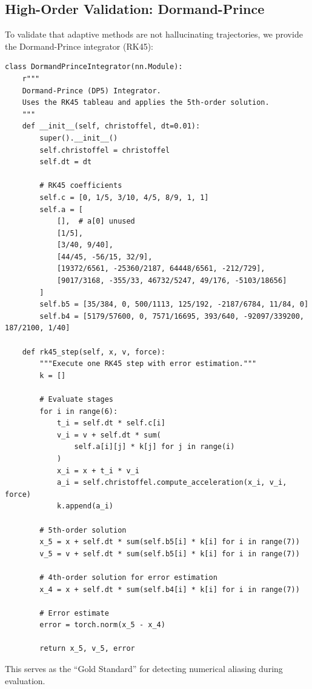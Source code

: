 \documentclass[12pt,letterpaper,twoside]{article}
\begin{document}
\subsection{High-Order Validation: Dormand-Prince}

To validate that adaptive methods are not hallucinating trajectories, we provide the Dormand-Prince integrator (RK45):

\begin{verbatim}
class DormandPrinceIntegrator(nn.Module):
    r"""
    Dormand-Prince (DP5) Integrator.
    Uses the RK45 tableau and applies the 5th-order solution.
    """
    def __init__(self, christoffel, dt=0.01):
        super().__init__()
        self.christoffel = christoffel
        self.dt = dt
        
        # RK45 coefficients
        self.c = [0, 1/5, 3/10, 4/5, 8/9, 1, 1]
        self.a = [
            [],  # a[0] unused
            [1/5],
            [3/40, 9/40],
            [44/45, -56/15, 32/9],
            [19372/6561, -25360/2187, 64448/6561, -212/729],
            [9017/3168, -355/33, 46732/5247, 49/176, -5103/18656]
        ]
        self.b5 = [35/384, 0, 500/1113, 125/192, -2187/6784, 11/84, 0]
        self.b4 = [5179/57600, 0, 7571/16695, 393/640, -92097/339200, 187/2100, 1/40]
    
    def rk45_step(self, x, v, force):
        """Execute one RK45 step with error estimation."""
        k = []
        
        # Evaluate stages
        for i in range(6):
            t_i = self.dt * self.c[i]
            v_i = v + self.dt * sum(
                self.a[i][j] * k[j] for j in range(i)
            )
            x_i = x + t_i * v_i
            a_i = self.christoffel.compute_acceleration(x_i, v_i, force)
            k.append(a_i)
        
        # 5th-order solution
        x_5 = x + self.dt * sum(self.b5[i] * k[i] for i in range(7))
        v_5 = v + self.dt * sum(self.b5[i] * k[i] for i in range(7))
        
        # 4th-order solution for error estimation
        x_4 = x + self.dt * sum(self.b4[i] * k[i] for i in range(7))
        
        # Error estimate
        error = torch.norm(x_5 - x_4)
        
        return x_5, v_5, error
\end{verbatim}

This serves as the ``Gold Standard'' for detecting numerical aliasing during evaluation.
\end{document}
